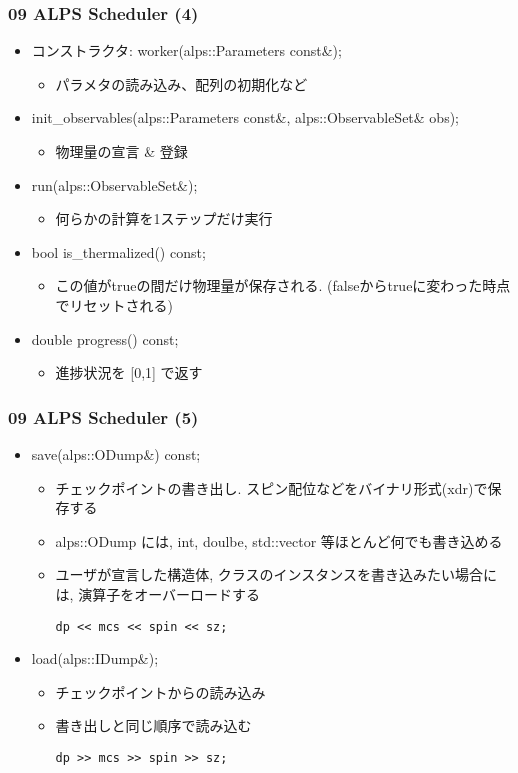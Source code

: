 \begin{frame}[fragile]
  \frametitle{09 ALPS Scheduler (4)}
  \begin{itemize}
    \item コンストラクタ: worker(alps::Parameters const\&);
      \begin{itemize}
        \item パラメタの読み込み、配列の初期化など
      \end{itemize}
    \item init\_observables(alps::Parameters const\&, alps::ObservableSet\& obs);
      \begin{itemize}
        \item 物理量の宣言 \& 登録
      \end{itemize}
    \item run(alps::ObservableSet\&);
      \begin{itemize}
        \item 何らかの計算を1ステップだけ実行
      \end{itemize}
    \item bool is\_thermalized() const;
      \begin{itemize}
        \item この値がtrueの間だけ物理量が保存される. (falseからtrueに変わった時点でリセットされる)
      \end{itemize}
    \item double progress() const;
      \begin{itemize}
        \item 進捗状況を [0,1] で返す
      \end{itemize}
  \end{itemize}
\end{frame}

\begin{frame}[fragile]
  \frametitle{09 ALPS Scheduler (5)}
  \begin{itemize}
    \item save(alps::ODump\&) const;
      \begin{itemize}
        \item チェックポイントの書き出し. スピン配位などをバイナリ形式(xdr)で保存する
        \item alps::ODump には, int, doulbe, std::vector 等ほとんど何でも書き込める
        \item ユーザが宣言した構造体, クラスのインスタンスを書き込みたい場合には, 演算子をオーバーロードする
\begin{lstlisting}
dp << mcs << spin << sz;
\end{lstlisting}
      \end{itemize}
    \item load(alps::IDump\&);
      \begin{itemize}
        \item チェックポイントからの読み込み
        \item 書き出しと同じ順序で読み込む
\begin{lstlisting}
dp >> mcs >> spin >> sz;
\end{lstlisting}
      \end{itemize}
  \end{itemize}
\end{frame}


